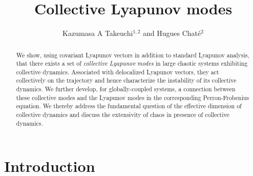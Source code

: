 \documentclass[12pt]{iopart}
\begin{document}


\newcommand{\rd}{\mathrm{d}}
\newcommand{\p}{\partial}
\newcommand{\px}{{\bi{x}}}
\newcommand{\expct}[1]{\langle #1 \rangle}
\newcommand{\Expct}[1]{\left\langle #1 \right\rangle}
\newcommand{\diff}[2]{\frac{\mathrm{d} #1}{\mathrm{d} #2}}
\newcommand{\prt}[2]{\frac{\partial #1}{\partial #2}}
\newcommand{\const}{\mathrm{const.}}
\renewcommand{\(}{\left(}
\renewcommand{\)}{\right)}
\renewcommand{\[}{\left[}
\renewcommand{\]}{\right]}
\newcommand{\im}{\mathrm{Im}}
\newcommand{\re}{\mathrm{Re}}


\title{Collective Lyapunov modes}

\author{Kazumasa A Takeuchi$^{1,2}$ and Hugues Chat\'e$^2$}

\address{$^1$ Department of Physics, the University of Tokyo,
 7-3-1 Hongo, Bunkyo-ku, Tokyo 113-0033, Japan.}
\address{$^2$ Service de Physique de l'\'Etat Condens\'e, CEA-Saclay, 91191 Gif-sur-Yvette, France.}
\begin{abstract}
We show, using covariant Lyapunov vectors in addition to
 standard Lyapunov analysis,
 that there exists a set of \textit{collective Lyapunov modes}
 in large chaotic systems exhibiting collective dynamics.
Associated with delocalized Lyapunov vectors,
 they act collectively on the trajectory and hence characterize the
 instability of its collective dynamics.
We further develop, for globally-coupled systems,
a connection between these collective modes and the Lyapunov modes
 in the corresponding Perron-Frobenius equation.
We thereby address the fundamental question of the effective dimension
 of collective dynamics and discuss
the extensivity of chaos in presence of collective dynamics.
\end{abstract}

\submitto{\JPA}

\section{Introduction}
\end{document}
